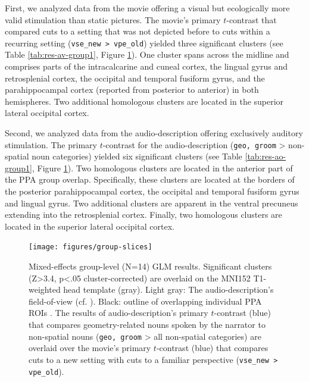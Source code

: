 \documentclass[english]{article}
\begin{document}
First, we analyzed data from the movie offering a visual but ecologically more
valid stimulation than static pictures.
The movie's primary $t$-contrast that compared cuts to a setting that was not
depicted before to cuts within a recurring setting (\texttt{vse\_new >
vpe\_old}) yielded three significant clusters (see Table
\ref{tab:res-av-group1}, Figure \ref{fig:group-slices}).
One cluster spans across the midline and comprises parts of the intracalcarine
and cuneal cortex, the lingual gyrus and retrosplenial cortex, the occipital and
temporal fusiform gyrus, and the parahippocampal cortex (reported from posterior
to anterior) in both hemispheres.
Two additional homologous clusters are located in the superior lateral occipital
cortex.

Second, we analyzed data from the audio-description offering exclusively
auditory stimulation.
The primary $t$-contrast for the audio-description (\texttt{geo, groom} >
non-spatial noun categories) yielded six significant clusters (see Table
\ref{tab:res-ao-group1}, Figure \ref{fig:group-slices}).
Two homologous clusters are located in the anterior part of the PPA group
overlap.
Specifically, these clusters are located at the borders of the posterior
parahippocampal cortex, the occipital and temporal fusiform gyrus and lingual
gyrus.
Two additional clusters are apparent in the ventral precuneus extending into the
retrosplenial cortex.
Finally, two homologous clusters are located in the superior lateral occipital
cortex.

\begin{figure}[h!] \centering
    \texttt{[image: figures/group-slices]}
    \caption{Mixed-effects group-level (N=14) GLM results. Significant clusters
        (Z>3.4, p<.05 cluster-corrected) are overlaid on the MNI152 T1-weighted
        head template (gray).
        Light gray: The audio-description's field-of-view
        (cf. \citep{hanke2014audiomovie}).
        Black: outline of overlapping individual PPA ROIs
        \citep{sengupta2016extension}.
        The results of audio-description's primary $t$-contrast (blue) that
        compares geometry-related nouns spoken by the narrator to non-spatial
        nouns (\texttt{geo, groom} > all non-spatial
        categories)
        are overlaid over the movie's primary $t$-contrast (blue) that compares
        cuts to a new setting with cuts to a familiar perspective
        (\texttt{vse\_new > vpe\_old}).
        }
    \label{fig:group-slices}
\end{figure}
\end{document}

